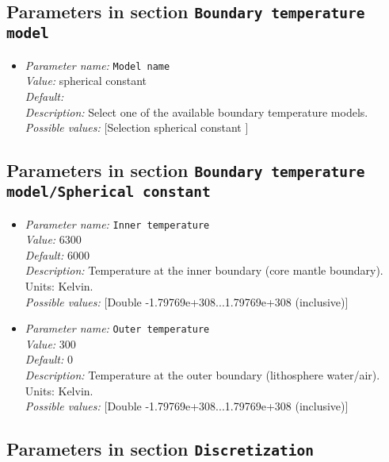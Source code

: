 \subsection{Parameters in section \tt Boundary temperature model}

\begin{itemize}
\item {\it Parameter name:} {\tt Model name}\\
{\it Value:} spherical constant\\
{\it Default:} \\
{\it Description:} Select one of the available boundary temperature models.\\
{\it Possible values:} [Selection spherical constant ]
\end{itemize}



\subsection{Parameters in section \tt Boundary temperature model/Spherical constant}

\begin{itemize}
\item {\it Parameter name:} {\tt Inner temperature}\\
{\it Value:} 6300\\
{\it Default:} 6000\\
{\it Description:} Temperature at the inner boundary (core mantle boundary). Units: Kelvin.\\
{\it Possible values:} [Double -1.79769e+308...1.79769e+308 (inclusive)]
\item {\it Parameter name:} {\tt Outer temperature}\\
{\it Value:} 300\\
{\it Default:} 0\\
{\it Description:} Temperature at the outer boundary (lithosphere water/air). Units: Kelvin.\\
{\it Possible values:} [Double -1.79769e+308...1.79769e+308 (inclusive)]
\end{itemize}

\subsection{Parameters in section \tt Discretization}

